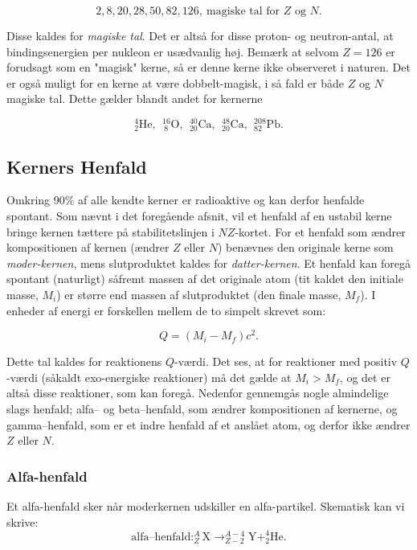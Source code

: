 \begin{equation}
2,8,20,28,50,82,126, ~\text{magiske tal for $Z$ og $N$}.
\label{eq:magicnumbers}
\end{equation}

Disse kaldes for \emph{magiske tal}. Det er altså for disse proton- og neutron-antal, at bindingsenergien per nukleon er usædvanlig høj. Bemærk at selvom $Z=126$ er forudsagt som en "magisk"  kerne, så er denne kerne ikke observeret i naturen. Det er også muligt for en kerne at være dobbelt-magisk, i så fald er både $Z$ og $N$ magiske tal. Dette gælder blandt andet for kernerne

\begin{equation*}
^{4}_{2}\text{He},~~ ^{16}_{~8}\text{O},~~ ^{40}_{20}\text{Ca},~~ ^{48}_{20}\text{Ca},~~  ^{208}_{82}\text{Pb}. 
\end{equation*}

\subsection{Kerners Henfald}

Omkring 90\% af alle kendte kerner er radioaktive og kan derfor henfalde spontant. Som nævnt i det foregående afsnit, vil et henfald af en ustabil kerne bringe kernen tættere på stabilitetslinjen i $NZ$-kortet. For et henfald som ændrer kompositionen af kernen (ændrer $Z$ eller $N$) benævnes den originale kerne som \emph{moder-kernen}, mens slutproduktet kaldes for \emph{datter-kernen}. Et henfald kan foregå spontant (naturligt) såfremt massen af det originale atom (tit kaldet den initiale masse, $M_i$) er større end massen af slutproduktet (den finale masse, $M_f$). I enheder af energi er forskellen mellem de to simpelt skrevet som:

\begin{equation}
Q =(M_i - M_f)c^2.
\label{eq:Qvalue}
\end{equation}

Dette tal kaldes for reaktionens $Q$-værdi. Det ses, at for reaktioner med positiv $Q$-værdi (såkaldt exo-energiske reaktioner) må det gælde at $M_i > M_f$, og det er altså disse reaktioner, som kan foregå. Nedenfor gennemgås nogle almindelige slags henfald; alfa-- og beta--henfald, som ændrer kompositionen af kernerne, og gamma--henfald, som er et indre henfald af et anslået atom, og derfor ikke ændrer $Z$ eller $N$.

\subsubsection{Alfa-henfald}
Et alfa-henfald sker når moderkernen udskiller en alfa-partikel. Skematisk kan vi skrive:
\begin{equation}
\text{alfa--henfald}: ^A_Z\text{X} \rightarrow ^{A-4}_{Z-2}\text{Y} + ^4_2\text{He}.
\label{eq:alfa} 
\end{equation}

